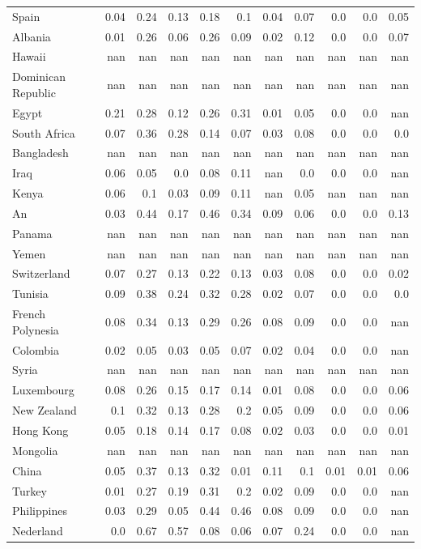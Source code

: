 \documentclass[11pt]{article}
\begin{document}
\begin{center}
\begin{longtable}{|p{70pt}|r|r|r|r|r|r|r|r|r|r|}
Spain& 0.04& 0.24& 0.13& 0.18& 0.1& 0.04& 0.07& 0.0& 0.0& 0.05\\
Albania& 0.01& 0.26& 0.06& 0.26& 0.09& 0.02& 0.12& 0.0& 0.0& 0.07\\
Hawaii& nan& nan& nan& nan& nan& nan& nan& nan& nan& nan\\
Dominican Republic& nan& nan& nan& nan& nan& nan& nan& nan& nan& nan\\
Egypt& 0.21& 0.28& 0.12& 0.26& 0.31& 0.01& 0.05& 0.0& 0.0& nan\\
South Africa& 0.07& 0.36& 0.28& 0.14& 0.07& 0.03& 0.08& 0.0& 0.0& 0.0\\
Bangladesh& nan& nan& nan& nan& nan& nan& nan& nan& nan& nan\\
Iraq& 0.06& 0.05& 0.0& 0.08& 0.11& nan& 0.0& 0.0& 0.0& nan\\
Kenya& 0.06& 0.1& 0.03& 0.09& 0.11& nan& 0.05& nan& nan& nan\\
An& 0.03& 0.44& 0.17& 0.46& 0.34& 0.09& 0.06& 0.0& 0.0& 0.13\\
Panama& nan& nan& nan& nan& nan& nan& nan& nan& nan& nan\\
Yemen& nan& nan& nan& nan& nan& nan& nan& nan& nan& nan\\
Switzerland& 0.07& 0.27& 0.13& 0.22& 0.13& 0.03& 0.08& 0.0& 0.0& 0.02\\
Tunisia& 0.09& 0.38& 0.24& 0.32& 0.28& 0.02& 0.07& 0.0& 0.0& 0.0\\
French Polynesia& 0.08& 0.34& 0.13& 0.29& 0.26& 0.08& 0.09& 0.0& 0.0& nan\\
Colombia& 0.02& 0.05& 0.03& 0.05& 0.07& 0.02& 0.04& 0.0& 0.0& nan\\
Syria& nan& nan& nan& nan& nan& nan& nan& nan& nan& nan\\
Luxembourg& 0.08& 0.26& 0.15& 0.17& 0.14& 0.01& 0.08& 0.0& 0.0& 0.06\\
New Zealand& 0.1& 0.32& 0.13& 0.28& 0.2& 0.05& 0.09& 0.0& 0.0& 0.06\\
Hong Kong& 0.05& 0.18& 0.14& 0.17& 0.08& 0.02& 0.03& 0.0& 0.0& 0.01\\
Mongolia& nan& nan& nan& nan& nan& nan& nan& nan& nan& nan\\
China& 0.05& 0.37& 0.13& 0.32& 0.01& 0.11& 0.1& 0.01& 0.01& 0.06\\
Turkey& 0.01& 0.27& 0.19& 0.31& 0.2& 0.02& 0.09& 0.0& 0.0& nan\\
Philippines& 0.03& 0.29& 0.05& 0.44& 0.46& 0.08& 0.09& 0.0& 0.0& nan\\
Nederland& 0.0& 0.67& 0.57& 0.08& 0.06& 0.07& 0.24& 0.0& 0.0& nan\\

\end{longtable}
\end{center}
\end{document}
